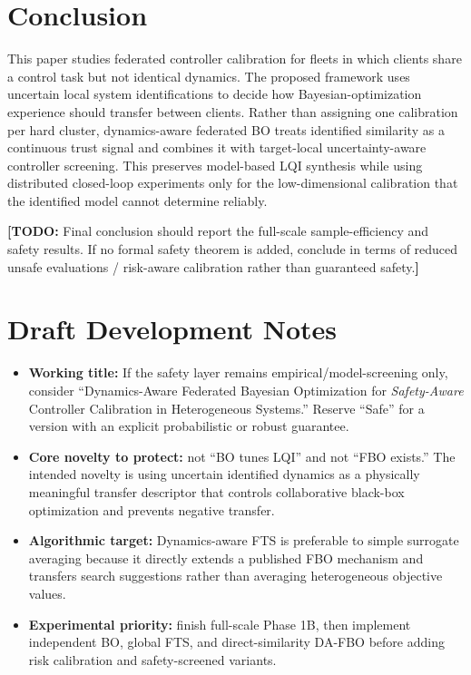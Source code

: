 \documentclass[conference]{IEEEtran}
\newcommand{\todo}[1]{\textcolor{red!70!black}{\textbf{[TODO:} #1\textbf{]}}}
\begin{document}
\section{Conclusion}
\label{sec:conclusion}
This paper studies federated controller calibration for fleets in which clients share a control task but not identical dynamics. The proposed framework uses uncertain local system identifications to decide how Bayesian-optimization experience should transfer between clients. Rather than assigning one calibration per hard cluster, dynamics-aware federated BO treats identified similarity as a continuous trust signal and combines it with target-local uncertainty-aware controller screening. This preserves model-based LQI synthesis while using distributed closed-loop experiments only for the low-dimensional calibration that the identified model cannot determine reliably.

\todo{Final conclusion should report the full-scale sample-efficiency and safety results. If no formal safety theorem is added, conclude in terms of reduced unsafe evaluations / risk-aware calibration rather than guaranteed safety.}

\section*{Draft Development Notes}
\begin{itemize}
\item \textbf{Working title:} If the safety layer remains empirical/model-screening only, consider ``Dynamics-Aware Federated Bayesian Optimization for \emph{Safety-Aware} Controller Calibration in Heterogeneous Systems.'' Reserve ``Safe'' for a version with an explicit probabilistic or robust guarantee.
\item \textbf{Core novelty to protect:} not ``BO tunes LQI'' and not ``FBO exists.'' The intended novelty is using uncertain identified dynamics as a physically meaningful transfer descriptor that controls collaborative black-box optimization and prevents negative transfer.
\item \textbf{Algorithmic target:} Dynamics-aware FTS is preferable to simple surrogate averaging because it directly extends a published FBO mechanism and transfers search suggestions rather than averaging heterogeneous objective values.
\item \textbf{Experimental priority:} finish full-scale Phase 1B, then implement independent BO, global FTS, and direct-similarity DA-FBO before adding risk calibration and safety-screened variants.
\end{itemize}



\end{document}
